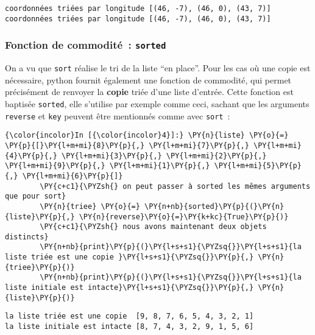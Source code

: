     \begin{Verbatim}[commandchars=\\\{\},frame=single,framerule=0.3mm,rulecolor=\color{cellframecolor}]
coordonnées triées par longitude [(46, -7), (46, 0), (43, 7)]
coordonnées triées par longitude [(46, -7), (46, 0), (43, 7)]
\end{Verbatim}

    \hypertarget{fonction-de-commodituxe9-sorted}{%
\subsubsection{\texorpdfstring{Fonction de commodité~:
\texttt{sorted}}{Fonction de commodité~: sorted}}\label{fonction-de-commodituxe9-sorted}}

    On a vu que \texttt{sort} réalise le tri de la liste ``en place''. Pour
les cas où une copie est nécessaire, python fournit également une
fonction de commodité, qui permet précisément de renvoyer la
\textbf{copie} triée d'une liste d'entrée. Cette fonction est baptisée
\texttt{sorted}, elle s'utilise par exemple comme ceci, sachant que les
arguments \texttt{reverse} et \texttt{key} peuvent être mentionnés comme
avec \texttt{sort}~:

    \begin{Verbatim}[commandchars=\\\{\},frame=single,framerule=0.3mm,rulecolor=\color{cellframecolor}]
{\color{incolor}In [{\color{incolor}4}]:} \PY{n}{liste} \PY{o}{=} \PY{p}{[}\PY{l+m+mi}{8}\PY{p}{,} \PY{l+m+mi}{7}\PY{p}{,} \PY{l+m+mi}{4}\PY{p}{,} \PY{l+m+mi}{3}\PY{p}{,} \PY{l+m+mi}{2}\PY{p}{,} \PY{l+m+mi}{9}\PY{p}{,} \PY{l+m+mi}{1}\PY{p}{,} \PY{l+m+mi}{5}\PY{p}{,} \PY{l+m+mi}{6}\PY{p}{]}
        \PY{c+c1}{\PYZsh{} on peut passer à sorted les mêmes arguments que pour sort}
        \PY{n}{triee} \PY{o}{=} \PY{n+nb}{sorted}\PY{p}{(}\PY{n}{liste}\PY{p}{,} \PY{n}{reverse}\PY{o}{=}\PY{k+kc}{True}\PY{p}{)}
        \PY{c+c1}{\PYZsh{} nous avons maintenant deux objets distincts}
        \PY{n+nb}{print}\PY{p}{(}\PY{l+s+s1}{\PYZsq{}}\PY{l+s+s1}{la liste triée est une copie }\PY{l+s+s1}{\PYZsq{}}\PY{p}{,} \PY{n}{triee}\PY{p}{)}
        \PY{n+nb}{print}\PY{p}{(}\PY{l+s+s1}{\PYZsq{}}\PY{l+s+s1}{la liste initiale est intacte}\PY{l+s+s1}{\PYZsq{}}\PY{p}{,} \PY{n}{liste}\PY{p}{)}
\end{Verbatim}


    \begin{Verbatim}[commandchars=\\\{\},frame=single,framerule=0.3mm,rulecolor=\color{cellframecolor}]
la liste triée est une copie  [9, 8, 7, 6, 5, 4, 3, 2, 1]
la liste initiale est intacte [8, 7, 4, 3, 2, 9, 1, 5, 6]
\end{Verbatim}

